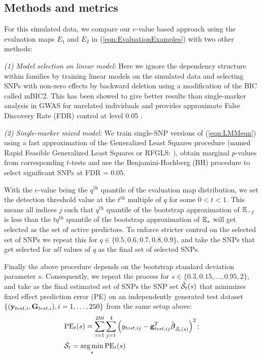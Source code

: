 \subsection{Methods and metrics}
For this simulated data, we compare our $e$-value based approach using the evaluation maps $E_1$ and $E_2$ in (\ref{eqn:EvaluationExamples}) with two other methods:

{\it (1) Model selection on linear model:} Here we ignore the dependency structure within families by training linear models on the simulated data and selecting SNPs with non-zero effects by backward deletion using a modification of the BIC called mBIC2. This has been showed to give better results than single-marker analysis in GWAS for unrelated individuals \citep{FrommeletEtal12} and provides approximate False Discovery Rate (FDR) control at level 0.05 \citep{BogdanEtal11}.

{\it (2) Single-marker mixed model:} We train single-SNP versions of (\ref{eqn:LMMeqn}) using a fast approximation of the Generalized Least Squares procedure (named Rapid Feasible Generalized Least Squares or RFGLS: \cite{LiEtal11}), obtain marginal $p$-values from corresponding $t$-tests and use the Benjamini-Hochberg (BH) procedure to select significant SNPs at FDR = $0.05$.

With the $e$-value being the $q^\text{th}$ quantile of the evaluation map distribution, we set the detection threshold value at the $t^\text{th}$ multiple of $q$ for some $0 < t < 1$. This means all indices $j$ such that $q^\text{th}$ quantile of the bootstrap approximation of ${\mathbb{E}}_{-j} $ is less than the $tq^\text{th}$ quantile of the bootstrap approximation of ${\mathbb{E}}_{*}$ will get selected as the set of active predictors. To enforce stricter control on the selected set of SNPs we repeat this for $q \in \{ 0.5, 0.6, 0.7, 0.8, 0.9 \}$, and take the SNPs that get selected for \textit{all} values of $q$ as the final set of selected SNPs.

Finally the above procedure depends on the bootstrap standard deviation parameter $s$. Consequently, we repeat the process for $s  \in \{ 0.3, 0.15, \ldots, 0.95, 2 \}$, and take as the final estimated set of SNPs the SNP set $\hat {{\cal{S}}}_t (s)$ that minimizes fixed effect prediction error (PE) on an independently generated test dataset $\{ ({\bf{y}}_{test,i}, {\mathbf{G}}_{test,i}), i = 1, \ldots, 250 \}$ from the same setup above:
%
\begin{align*}
& \text{PE}_t (s)  = \sum_{i=1}^{250} \sum_{j=1}^4 \left( y_{test,ij} - {\bf{g}}_{test,ij}^T \hat {{\boldsymbol{\beta}}}_{\hat {{\cal{S}}}_t (s)} \right)^2; \\
& \hat {{\cal{S}}}_t = \operatorname*{arg\,min}_s \text{PE}_t (s)
\end{align*}


